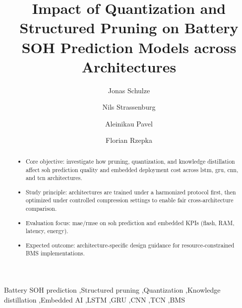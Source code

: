 \documentclass[final,3p,times]{elsarticle}
\date{}
\def\corref#1{}
\begin{document}


\newcommand{\mypar}[1]{%
  \smallskip
  \noindent
  \textbf{#1.}%
}

\begin{frontmatter}
\title{Impact of Quantization and Structured Pruning on Battery SOH Prediction Models across Architectures}

\author[hpi]{Jonas Schulze}
\author[hpi]{Nils Strassenburg}
\author[tu]{Aleinikau Pavel}
\author[tu]{Florian Rzepka\corref{cor1}}


\begin{abstract}
\begin{itemize}[leftmargin=*]
\item Core objective: investigate how pruning, quantization, and knowledge distillation affect \ac{soh} prediction quality and embedded deployment cost across \ac{lstm}, \ac{gru}, \ac{cnn}, and \ac{tcn} architectures.
\item Study principle: architectures are trained under a harmonized protocol first, then optimized under controlled compression settings to enable fair cross-architecture comparison.
\item Evaluation focus: \ac{mae}/\ac{rmse} on \ac{soh} prediction and embedded KPIs (flash, RAM, latency, energy).
\item Expected outcome: architecture-specific design guidance for resource-constrained BMS implementations.
\end{itemize}
\end{abstract}

\begin{keyword}
Battery SOH prediction \sep Structured pruning \sep Quantization \sep Knowledge distillation \sep Embedded AI \sep LSTM \sep GRU \sep CNN \sep TCN \sep BMS
\end{keyword}
\end{frontmatter}
\end{document}
